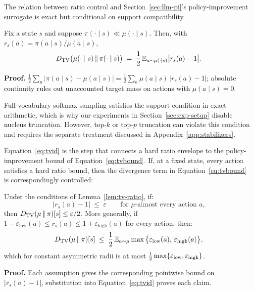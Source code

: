 The relation between ratio control and Section~\ref{sec:llm-pi}'s policy-improvement surrogate is exact but conditional on support compatibility.

\begin{lemma}
\label{lem:tv-ratio}
Fix a state $s$ and suppose $\pi(\cdot\mid s)\ll\mu(\cdot\mid s)$. Then, with $r_s(a)=\pi(a\mid s)/\mu(a\mid s)$,
\begin{equation}
D_{\mathrm{TV}}\big(\mu(\cdot\mid s)\,\|\,\pi(\cdot\mid s)\big)
\;=\;\frac12\,\mathbb{E}_{a\sim\mu(\cdot\mid s)}\big|r_s(a)-1\big|.
\label{eq:tvid}
\end{equation}
\end{lemma}
\textbf{Proof.}
$\frac12\sum_{a}|\pi(a\mid s)-\mu(a\mid s)|=\frac12\sum_{a}\mu(a\mid s)\,|r_s(a)-1|$; absolute continuity rules out unaccounted target mass on actions with $\mu(a\mid s)=0$.

Full-vocabulary softmax sampling satisfies the support condition in exact arithmetic, which is why our experiments in Section~\ref{sec:exp-setup} disable nucleus truncation. However, top-$k$ or top-$p$ truncation can violate this condition and requires the separate treatment discussed in Appendix~\ref{app:stabilizers}.

Equation~\eqref{eq:tvid} is the step that connects a hard ratio envelope to the policy-improvement bound of Equation~\eqref{eq:tvbound}. If, at a fixed state, every action satisfies a hard ratio bound, then the divergence term in Equation~\eqref{eq:tvbound} is correspondingly controlled:
\begin{proposition}
\label{prop:hard-ratio}
Under the conditions of Lemma~\ref{lem:tv-ratio}, if:
\begin{equation}
|r_s(a)-1|\;\le\;\varepsilon\qquad\text{for $\mu$-almost every action $a$,}
\label{eq:all-action}
\end{equation}
then $D_{\mathrm{TV}}(\mu\,\|\,\pi)[s]\le\varepsilon/2$. More generally, if $1-\varepsilon_{\mathrm{low}}(a)\le r_s(a)\le 1+\varepsilon_{\mathrm{high}}(a)$ for every action, then:
\begin{equation}
D_{\mathrm{TV}}(\mu\,\|\,\pi)[s]\;\le\;\frac12\,\mathbb{E}_{a\sim\mu}\max\big\{\varepsilon_{\mathrm{low}}(a),\,\varepsilon_{\mathrm{high}}(a)\big\},
\label{eq:asym-tv}
\end{equation}
which for constant asymmetric radii is at most $\tfrac12\max\{\varepsilon_{\mathrm{low}},\varepsilon_{\mathrm{high}}\}$.
\end{proposition}
\textbf{Proof.}
Each assumption gives the corresponding pointwise bound on $|r_s(a)-1|$, substitution into Equation~\eqref{eq:tvid} proves each claim.

